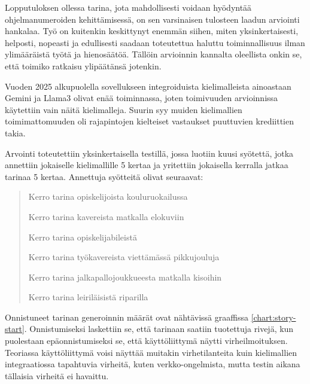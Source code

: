Lopputuloksen ollessa tarina, jota mahdollisesti voidaan hyödyntää
ohjelmanumeroiden kehittämisessä, on sen varsinaisen tulosteen laadun arviointi
hankalaa. Työ on kuitenkin keskittynyt enemmän siihen, miten yksinkertaisesti,
helposti, nopeasti ja edullisesti saadaan toteutettua haluttu toiminnallisuus
ilman ylimääräistä työtä ja hienosäätöä. Tällöin arvioinnin kannalta oleellista
onkin se, että toimiko ratkaisu ylipäätänsä jotenkin.

Vuoden 2025 alkupuolella sovellukseen integroiduista kielimalleista ainoastaan
Gemini ja Llama3 olivat enää toiminnassa, joten toimivuuden arvioinnissa
käytettiin vain näitä kielimalleja. Suurin syy muiden kielimallien
toimimattomuuden oli rajapintojen kielteiset vastaukset puuttuvien krediittien
takia.

Arvointi toteutettiin yksinkertaisella testillä, jossa luotiin kuusi syötettä,
jotka annettiin jokaiselle kielimallille 5 kertaa ja yritettiin jokaisella
kerralla jatkaa tarinaa 5 kertaa. Annettuja syötteitä olivat seuraavat:

\begin{quotation}
    \noindent Kerro tarina opiskelijoista kouluruokailussa

    \noindent Kerro tarina kavereista matkalla elokuviin

    \noindent Kerro tarina opiskelijabileistä

    \noindent Kerro tarina työkavereista viettämässä pikkujouluja

    \noindent Kerro tarina jalkapallojoukkueesta matkalla kisoihin

    \noindent Kerro tarina leiriläisistä riparilla
\end{quotation}

Onnistuneet tarinan generoinnin määrät ovat nähtävissä graaffissa
\ref{chart:story-start}. Onnistumiseksi laskettiin se, että tarinaan saatiin
tuotettuja rivejä, kun puolestaan epäonnistumiseksi se, että käyttöliittymä
näytti virheilmoituksen. Teoriassa käyttöliittymä voisi näyttää muitakin
virhetilanteita kuin kielimallien integraatiossa tapahtuvia virheitä, kuten
verkko-ongelmista, mutta testin aikana tällaisia virheitä ei havaittu.

